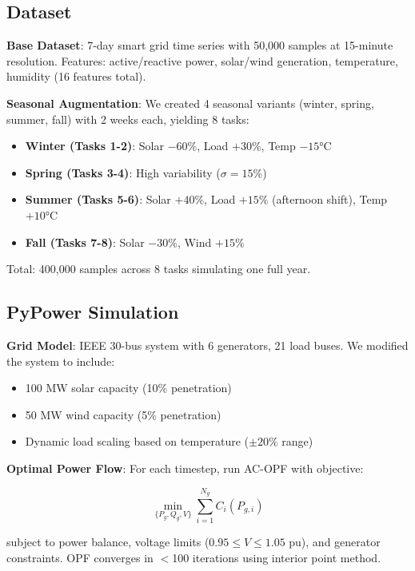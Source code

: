 \documentclass[journal]{IEEEtran}
\begin{document}
\subsection{Dataset}

\textbf{Base Dataset}: 7-day smart grid time series with 50,000 samples at 15-minute resolution. Features: active/reactive power, solar/wind generation, temperature, humidity (16 features total).

\textbf{Seasonal Augmentation}: We created 4 seasonal variants (winter, spring, summer, fall) with 2 weeks each, yielding 8 tasks:
\begin{itemize}
    \item \textbf{Winter (Tasks 1-2)}: Solar $-60\%$, Load $+30\%$, Temp $-15$°C
    \item \textbf{Spring (Tasks 3-4)}: High variability ($\sigma = 15\%$)
    \item \textbf{Summer (Tasks 5-6)}: Solar $+40\%$, Load $+15\%$ (afternoon shift), Temp $+10$°C
    \item \textbf{Fall (Tasks 7-8)}: Solar $-30\%$, Wind $+15\%$
\end{itemize}

Total: 400,000 samples across 8 tasks simulating one full year.

\subsection{PyPower Simulation}

\textbf{Grid Model}: IEEE 30-bus system \cite{ieee30bus} with 6 generators, 21 load buses. We modified the system to include:
\begin{itemize}
    \item 100 MW solar capacity (10\% penetration)
    \item 50 MW wind capacity (5\% penetration)
    \item Dynamic load scaling based on temperature ($\pm 20\%$ range)
\end{itemize}

\textbf{Optimal Power Flow}: For each timestep, run AC-OPF with objective:

\begin{equation}
\min_{\{P_g, Q_g, V\}} \sum_{i=1}^{N_g} C_i(P_{g,i})
\end{equation}

subject to power balance, voltage limits ($0.95 \leq V \leq 1.05$ pu), and generator constraints. OPF converges in $<$100 iterations using interior point method.
\end{document}
